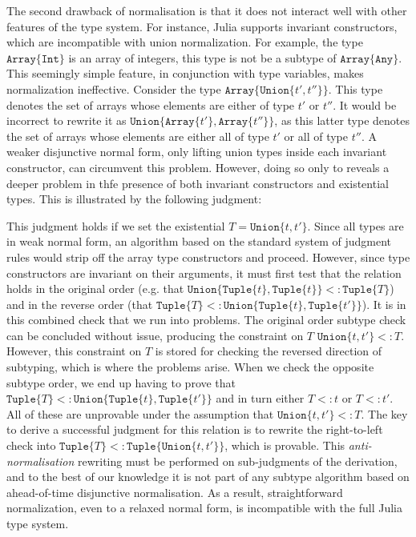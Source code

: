 \documentclass[a4paper,english]{lipics-v2019}
\newcommand{\xt}[1]{\texttt{#1}}
\newcommand{\union}[2]{\xt{Union\{}#1,#2\xt{\}}}
\newcommand{\tuple}[1]{\xt{Tuple\{}#1\xt{\}}}
\newcommand{\arrayt}[1]{\xt{Array\{}#1\xt{\}}}
\begin{document}
The second drawback of normalisation is that it does not interact well with
other features of the type system. For instance, Julia supports invariant
constructors, which are incompatible with union normalization. For example,
the type $\arrayt{\xt{Int}}$ is an array of integers, this type is not be a
subtype of $\arrayt{\xt{Any}}$. This seemingly simple feature, in
conjunction with type variables, makes normalization ineffective.
Consider the type {\small \(\arrayt{\union{t'}{t''}}\)}. This type denotes the set
of arrays whose elements are either of type {\small $t'$} or {\small   $t''$}.
It would be incorrect to rewrite it as {\small
\(\union{\arrayt{t'}}{\arrayt{t''}}\)}, as this latter type denotes the set of
arrays whose elements are either all of type {\small $t'$} or all of type
{\small$t''$}. A weaker disjunctive normal form, only lifting union types
inside each invariant constructor, can circumvent this problem. However, doing
so only to reveals a deeper problem in thfe presence of both invariant
constructors and {existential types}. This is illustrated by the following judgment:

%
\vspace{-3mm}{\small\[
  \arrayt{\union{\tuple{t}}{\tuple{t'}}} \ \ <:\ \ \exists T\,.\, \arrayt{\tuple{T}}
\]}\vspace{-3mm}
%

\noindent 
This judgment holds if we set the existential {\small$T=\union{t}{t'}$}.
Since all types are in weak normal form, an algorithm based on the standard
system of judgment rules would strip off the array type constructors and
proceed.  However, since type constructors are invariant on their arguments,
it must first test that the relation holds in the original order (e.g. that
$\union{\tuple{t}}{\tuple{t}} <: \tuple{T}$) and in the reverse order (that
$\tuple{T} <: \union{\tuple{t}}{\tuple{t'}}$). It is in this combined check
that we run into problems.
%
The original order subtype check can be concluded without issue, producing
the constraint on $T$ {\small$\union{t}{t'} <: T$}. However, this constraint
on $T$ is stored for checking the reversed direction of subtyping, which is
where the problems arise. When we check the opposite subtype order, we end
up having to prove that {\small$\tuple{T}<:\union{\tuple{t}}{\tuple{t'}}$}
and in turn either {\small$T<:t$} or {\small$T<:t'$}. All of these are
unprovable under the assumption that {\small$\union{t}{t'} <: T$}.
%
The key to derive a successful judgment for this relation is to rewrite the
right-to-left check into {\small$\tuple{T}<:\tuple{\union{t}{t'}}$}, which is
provable. This \emph{anti-normalisation} rewriting must be performed on
sub-judgments of the derivation, and to the best of our knowledge it is not
part of any subtype algorithm based on ahead-of-time disjunctive
normalisation. As a result, straightforward normalization, even to a relaxed
normal form, is incompatible with the full Julia type system.
\end{document}
